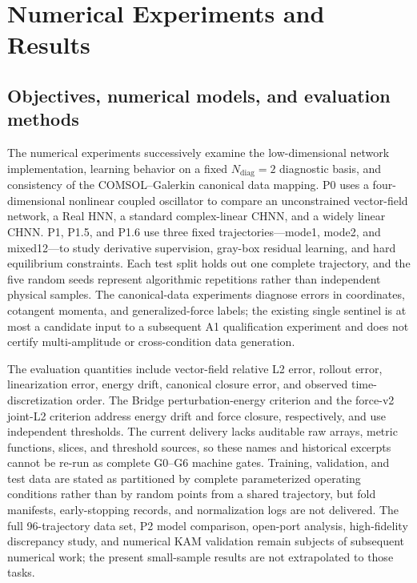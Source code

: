 \section{Numerical Experiments and Results}\label{sec:numerical-results}

\subsection{Objectives, numerical models, and evaluation methods}\label{sec:numerical-6-1}

The numerical experiments successively examine the low-dimensional network implementation, learning behavior on a fixed \(N_{\mathrm{diag}}=2\) diagnostic basis, and consistency of the COMSOL--Galerkin canonical data mapping. P0 uses a four-dimensional nonlinear coupled oscillator to compare an unconstrained vector-field network, a Real HNN, a standard complex-linear CHNN, and a widely linear CHNN. P1, P1.5, and P1.6 use three fixed trajectories---mode1, mode2, and mixed12---to study derivative supervision, gray-box residual learning, and hard equilibrium constraints. Each test split holds out one complete trajectory, and the five random seeds represent algorithmic repetitions rather than independent physical samples. The canonical-data experiments diagnose errors in coordinates, cotangent momenta, and generalized-force labels; the existing single sentinel is at most a candidate input to a subsequent A1 qualification experiment and does not certify multi-amplitude or cross-condition data generation.

The evaluation quantities include vector-field relative L2 error, rollout error, linearization error, energy drift, canonical closure error, and observed time-discretization order. The Bridge perturbation-energy criterion and the force-v2 joint-L2 criterion address energy drift and force closure, respectively, and use independent thresholds. The current delivery lacks auditable raw arrays, metric functions, slices, and threshold sources, so these names and historical excerpts cannot be re-run as complete G0--G6 machine gates. Training, validation, and test data are stated as partitioned by complete parameterized operating conditions rather than by random points from a shared trajectory, but fold manifests, early-stopping records, and normalization logs are not delivered. The full 96-trajectory data set, P2 model comparison, open-port analysis, high-fidelity discrepancy study, and numerical KAM validation remain subjects of subsequent numerical work; the present small-sample results are not extrapolated to those tasks.

